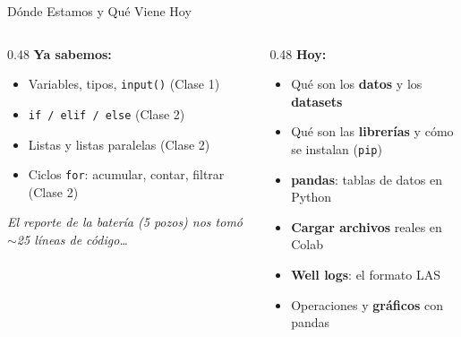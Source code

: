 \documentclass[aspectratio=169, 11pt]{beamer}
\begin{document}
\begin{frame}{Dónde Estamos y Qué Viene Hoy}
  \vspace{-6pt}
  \begin{columns}[T]
    \begin{column}{0.48\textwidth}
      {\small\color{arcaDark}\bfseries\faCheckCircle\hspace{5pt}Ya sabemos:}
      \vspace{4pt}
      {\footnotesize\color{textMuted}
      \begin{itemize}\setlength{\itemsep}{3pt}
        \item[{\color{codeGreen}\scriptsize\faCheck}]
          Variables, tipos, \texttt{input()} (Clase 1)
        \item[{\color{codeGreen}\scriptsize\faCheck}]
          \texttt{if / elif / else} (Clase 2)
        \item[{\color{codeGreen}\scriptsize\faCheck}]
          Listas y listas paralelas (Clase 2)
        \item[{\color{codeGreen}\scriptsize\faCheck}]
          Ciclos \texttt{for}: acumular, contar, filtrar (Clase 2)
      \end{itemize}
      }

      \vspace{8pt}
      {\scriptsize\color{textMuted}\itshape
        El reporte de la batería (5 pozos) nos tomó
        \(\sim\)25 líneas de código\ldots}
    \end{column}

    \begin{column}{0.48\textwidth}
      {\small\color{arcaDark}\bfseries\faForward\hspace{5pt}Hoy:}
      \vspace{4pt}
      {\footnotesize\color{textMuted}
      \begin{itemize}\setlength{\itemsep}{3pt}
        \item[{\color{arcaRed}\scriptsize\faArrowRight}]
          Qué son los \textbf{datos} y los \textbf{datasets}
        \item[{\color{arcaRed}\scriptsize\faArrowRight}]
          Qué son las \textbf{librerías} y cómo se instalan (\texttt{pip})
        \item[{\color{arcaRed}\scriptsize\faArrowRight}]
          \textbf{pandas}: tablas de datos en Python
        \item[{\color{arcaRed}\scriptsize\faArrowRight}]
          \textbf{Cargar archivos} reales en Colab
        \item[{\color{arcaRed}\scriptsize\faArrowRight}]
          \textbf{Well logs}: el formato LAS
        \item[{\color{arcaRed}\scriptsize\faArrowRight}]
          Operaciones y \textbf{gráficos} con pandas
      \end{itemize}
      }


\end{column}
\end{columns}
\end{frame}
\end{document}
